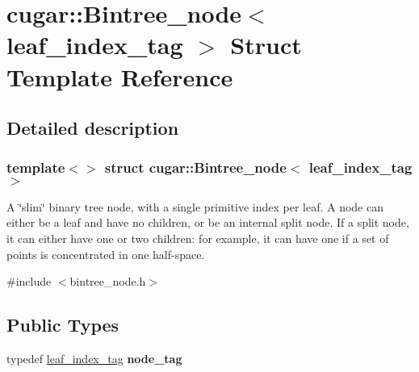 \hypertarget{structcugar_1_1_bintree__node_3_01leaf__index__tag_01_4}{}\section{cugar\+:\+:Bintree\+\_\+node$<$ leaf\+\_\+index\+\_\+tag $>$ Struct Template Reference}
\label{structcugar_1_1_bintree__node_3_01leaf__index__tag_01_4}


\subsection{Detailed description}
\subsubsection*{template$<$$>$\newline
struct cugar\+::\+Bintree\+\_\+node$<$ leaf\+\_\+index\+\_\+tag $>$}

A \char`\"{}slim\char`\"{} binary tree node, with a single primitive index per leaf. A node can either be a leaf and have no children, or be an internal split node. If a split node, it can either have one or two children\+: for example, it can have one if a set of points is concentrated in one half-\/space. 

{\ttfamily \#include $<$bintree\+\_\+node.\+h$>$}

\subsection*{Public Types}
\begin{DoxyCompactItemize}
\item 
\mbox{\label{structcugar_1_1_bintree__node_3_01leaf__index__tag_01_4_a73fc70cf26b52f223b0222f9ed482bd6}} 
typedef \hyperlink{structcugar_1_1leaf__index__tag}{leaf\+\_\+index\+\_\+tag} {\bfseries node\+\_\+tag}
\end{DoxyCompactItemize}
